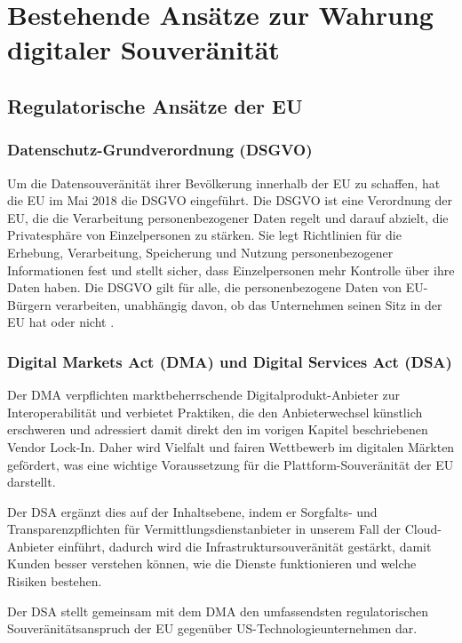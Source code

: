 \chapter{Bestehende Ansätze zur Wahrung digitaler Souveränität}
\label{ch:ansatz}

\section{Regulatorische Ansätze der EU}

\subsection{Datenschutz-Grundverordnung (DSGVO)}
\label{sec:dsgvo}
Um die Datensouveränität ihrer Bevölkerung innerhalb der \ac{EU} zu schaffen, hat die EU im Mai 2018 die \ac{DSGVO} eingeführt.
Die \ac{DSGVO} \cite{gdpr2016} ist eine Verordnung der \ac{EU}, die die Verarbeitung personenbezogener Daten regelt und darauf abzielt, die Privatesphäre von Einzelpersonen zu stärken.
Sie legt Richtlinien für die Erhebung, Verarbeitung, Speicherung und Nutzung personenbezogener Informationen fest und stellt sicher, 
dass Einzelpersonen mehr Kontrolle über ihre Daten haben. Die \ac{DSGVO} gilt für alle, die personenbezogene Daten von EU-Bürgern verarbeiten, unabhängig davon, ob das Unternehmen seinen Sitz in der \ac{EU} hat oder nicht \cite[Art.3]{gdpr2016}.

\subsection{Digital Markets Act (DMA) und Digital Services Act (DSA)}
Der \ac{DMA} \cite{bmwe2023dma} verpflichten marktbeherrschende 
Digitalprodukt-Anbieter zur Interoperabilität und verbietet Praktiken, 
die den Anbieterwechsel künstlich erschweren und adressiert 
damit direkt den im vorigen Kapitel beschriebenen Vendor Lock-In.
Daher wird Vielfalt und fairen Wettbewerb im digitalen Märkten gefördert, 
was eine wichtige Voraussetzung für die Plattform-Souveränität der \ac{EU} darstellt.

Der \ac{DSA} \cite{bka2022dsa} ergänzt dies auf der 
Inhaltsebene, indem er Sorgfalts- und Transparenzpflichten  
für Vermittlungsdienstanbieter in unserem Fall der Cloud-Anbieter 
einführt, dadurch wird die Infrastruktursouveränität gestärkt, damit 
Kunden besser verstehen können, wie die Dienste funktionieren und welche Risiken bestehen.

Der \ac{DSA} stellt gemeinsam mit dem \ac{DMA}
den umfassendsten regulatorischen Souveränitätsanspruch 
der \ac{EU} gegenüber US-Technologieunternehmen dar.

